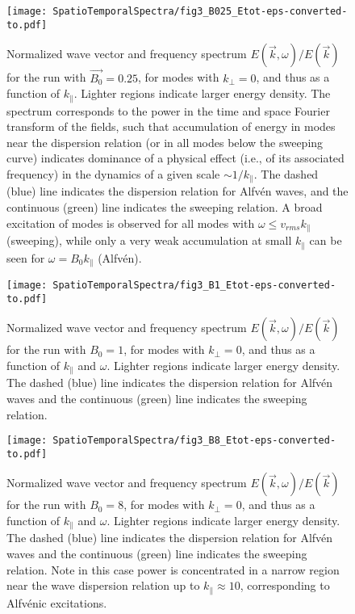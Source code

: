 \begin{figure}
  \centering 
  \texttt{[image: SpatioTemporalSpectra/fig3\_B025\_Etot-eps-converted-to.pdf]}
  \caption{Normalized wave vector and frequency spectrum $E(\vec{k},
    \omega)/E(\vec{k})$ for the run with $\vec{B_0}=0.25$, for modes
    with $k_\perp=0$, and thus as a function of $k_\parallel$. Lighter
    regions indicate larger energy density. The spectrum corresponds
    to the power in the time and space Fourier transform of the
    fields, such that accumulation of energy in modes near the
    dispersion relation (or in all modes below the sweeping curve)
    indicates dominance of a physical effect (i.e., of its associated
    frequency) in the dynamics of a given scale $\sim
    1/k_\parallel$. The dashed (blue) line indicates the dispersion
    relation for Alfv\'en waves, and the continuous (green) line
    indicates the sweeping relation. A broad excitation of modes is
    observed for all modes with $\omega \leq v_{rms} k_\parallel$
    (sweeping), while only a very weak accumulation at small
    $k_\parallel$ can be seen for $\omega=B_0 k_\parallel$
    (Alfv\'en).}
  \label{fig3:B025_bvf_Etot_kperp0}
\end{figure}

\begin{figure}
  \centering
  \texttt{[image: SpatioTemporalSpectra/fig3\_B1\_Etot-eps-converted-to.pdf]}
  \caption{Normalized wave vector and frequency spectrum $E(\vec{k},
    \omega)/E(\vec{k})$ for the run with $B_0=1$, for modes with
    $k_\perp=0$, and thus as a function of $k_\parallel$ and
    $\omega$. Lighter regions indicate larger energy density. The
    dashed (blue) line indicates the dispersion relation for Alfv\'en
    waves and the continuous (green) line indicates the sweeping
    relation.}
  \label{fig3:B1_bvf_Etot_kperp0}
\end{figure}

\begin{figure}
  \centering
  \texttt{[image: SpatioTemporalSpectra/fig3\_B8\_Etot-eps-converted-to.pdf]}
  \caption{Normalized wave vector and frequency spectrum $E(\vec{k},
    \omega)/E(\vec{k})$ for the run with $B_0=8$, for modes with
    $k_\perp=0$, and thus as a function of $k_\parallel$ and
    $\omega$. Lighter regions indicate larger energy density. The
    dashed (blue) line indicates the dispersion relation for Alfv\'en
    waves and the continuous (green) line indicates the sweeping
    relation. Note in this case power is concentrated in a narrow
    region near the wave dispersion relation up to 
    $k_\parallel \approx 10$, corresponding to Alfv\'enic
    excitations.}
  \label{fig3:B8_bvf_Etot_kperp0}
\end{figure}


